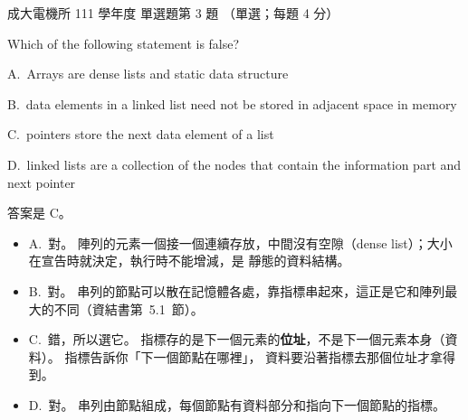 \begin{pastexam}[label={px:ncku-111-ee-ds-03}]{成大電機所 111 學年度 單選題第 3 題}
（單選；每題 4 分）

Which of the following statement is false?

A.~Arrays are dense lists and static data structure

B.~data elements in a linked list need not be stored in adjacent space in memory

C.~pointers store the next data element of a list

D.~linked lists are a collection of the nodes that contain the information part and next pointer
\end{pastexam}

\begin{pastsoln}
答案是 C。

\begin{itemize}
\item A.~對。 陣列的元素一個接一個連續存放，中間沒有空隙（dense list）；大小在宣告時就決定，執行時不能增減，是
靜態的資料結構。
\item B.~對。 串列的節點可以散在記憶體各處，靠指標串起來，這正是它和陣列最大的不同（資結書第~5.1~節）。
\item C.~錯，所以選它。 指標存的是下一個元素的\textbf{位址}，不是下一個元素本身（資料）。 指標告訴你「下一個節點在哪裡」，
資料要沿著指標去那個位址才拿得到。
\item D.~對。 串列由節點組成，每個節點有資料部分和指向下一個節點的指標。
\end{itemize}
\end{pastsoln}
